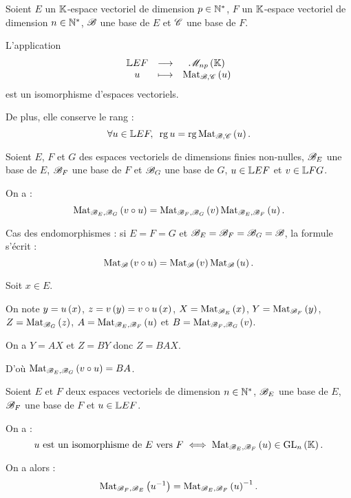 \begin{prop}
Soient \(E\) un \(\mathbb{K}\)-espace vectoriel de dimension \(p\in\mathbb{N}^*\), \(F\) un \(\mathbb{K}\)-espace vectoriel de dimension \(n\in\mathbb{N}^*\), \(\mathscr{B}\) une base de \(E\) et \(\mathscr{C}\) une base de \(F\).

L'application \[\fonctionlambda{\L{E}{F}}{\M{np}}{u}{\Mat[\fami{B},\fami{C}]{u}}\] est un isomorphisme d'espaces vectoriels.

De plus, elle conserve le rang : \[\quantifs{\forall u\in\L{E}{F}}\rg u=\rg\Mat[\fami{B},\fami{C}]{u}.\]
\end{prop}

\begin{prop}
Soient \(E\), \(F\) et \(G\) des espaces vectoriels de dimensions finies non-nulles, \(\mathscr{B}_E\) une base de \(E\), \(\mathscr{B}_F\) une base de \(F\) et \(\mathscr{B}_G\) une base de \(G\), \(u\in\mathbb{L}{E}{F}\) et \(v\in\mathbb{L}{F}{G}\).

On a : \[\Mat[\fami{B}_E,\fami{B}_G]{v\rond u}=\Mat[\fami{B}_F,\fami{B}_G]{v}\Mat[\fami{B}_E,\fami{B}_F]{u}.\]

Cas des endomorphismes : si \(E=F=G\) et \(\mathscr{B}_E=\mathscr{B}_F=\mathscr{B}_G=\mathscr{B}\), la formule s'écrit : \[\Mat{v\rond u}=\Mat{v}\Mat{u}.\]
\end{prop}

\begin{dem}
Soit \(x\in E\).

On note \(y=u\left(x\right)\), \(z=v\left(y\right)=v\circ u\left(x\right)\), \(X=\Mat[\fami{B}_E]{x}\), \(Y=\Mat[\fami{B}_F]{y}\), \(Z=\Mat[\fami{B}_G]{z}\), \(A=\Mat[\fami{B}_E,\fami{B}_F]{u}\) et \(B=\Mat[\fami{B}_F,\fami{B}_G]{v}\).

On a \(Y=AX\) et \(Z=BY\) donc \(Z=BAX\).

D'où \(\Mat[\fami{B}_E,\fami{B}_G]{v\rond u}=BA\).
\end{dem}

\begin{prop}
Soient \(E\) et \(F\) deux espaces vectoriels de dimension \(n\in\mathbb{N}^*\), \(\mathscr{B}_E\) une base de \(E\), \(\mathscr{B}_F\) une base de \(F\) et \(u\in\mathbb{L}{E}{F}\).

On a : \[u\text{ est un isomorphisme de }E\text{ vers }F\ssi\Mat[\fami{B}_E,\fami{B}_F]{u}\in\GL{n}.\]

On a alors : \[\Mat[\fami{B}_F,\fami{B}_E]{u\inv}=\Mat[\fami{B}_E,\fami{B}_F]{u}\inv.\]
\end{prop}

